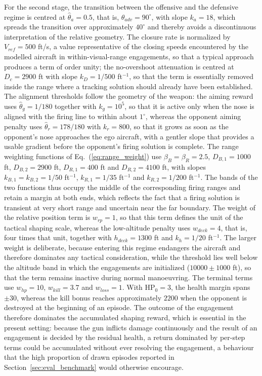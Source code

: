 \documentclass[pdflatex,sn-mathphys-num]{sn-jnl}%
\theoremstyle{thmstyleone}%
\theoremstyle{thmstyletwo}%
\theoremstyle{thmstylethree}%
\begin{document}
For the second stage, the transition between the offensive and the defensive regime is centred at $\hat{\theta}_{a}=0.5$, that is, $\theta_{adv}=90^\circ$, with slope $k_{a}=18$, which spreads the transition over approximately $40^\circ$ and thereby avoids a discontinuous interpretation of the relative geometry. The closure rate is normalized by $V_{ref}=500$ ft/s, a value representative of the closing speeds encountered by the modelled aircraft in within-visual-range engagements, so that a typical approach produces a term of order unity; the no-overshoot attenuation is centred at $D_{c}=2900$ ft with slope $k_{D}=1/500$ ft$^{-1}$, so that the term is essentially removed inside the range where a tracking solution should already have been established. The alignment thresholds follow the geometry of the weapon: the aiming reward uses $\hat{\theta}_{g}=1/180$ together with $k_{g}=10^{5}$, so that it is active only when the nose is aligned with the firing line to within about $1^\circ$, whereas the opponent aiming penalty uses $\hat{\theta}_{r}=178/180$ with $k_{r}=800$, so that it grows as soon as the opponent's nose approaches the ego aircraft, with a gentler slope that provides a usable gradient before the opponent's firing solution is complete. The range weighting functions of Eq.~(\ref{eq:range_weight}) use $\beta_{B}=\beta_{R}=2.5$, $D_{B,1}=1000$ ft, $D_{B,2}=2900$ ft, $D_{R,1}=400$ ft and $D_{R,2}=4100$ ft, with slopes $k_{B,1}=k_{B,2}=1/50$ ft$^{-1}$, $k_{R,1}=1/35$ ft$^{-1}$ and $k_{R,2}=1/200$ ft$^{-1}$. The bands of the two functions thus occupy the middle of the corresponding firing ranges and retain a margin at both ends, which reflects the fact that a firing solution is transient at very short range and uncertain near the far boundary. The weight of the relative position term is $w_{rp}=1$, so that this term defines the unit of the tactical shaping scale, whereas the low-altitude penalty uses $w_{deck}=4$, that is, four times that unit, together with $h_{deck}=1300$ ft and $k_{h}=1/20$ ft$^{-1}$. The larger weight is deliberate, because entering this regime endangers the aircraft and therefore dominates any tactical consideration, while the threshold lies well below the altitude band in which the engagements are initialized ($10000\pm1000$ ft), so that the term remains inactive during normal manoeuvring. The terminal terms use $w_{hp}=10$, $w_{kill}=3.7$ and $w_{loss}=1$. With $\mathrm{HP}_{0}=3$, the health margin spans $\pm30$, whereas the kill bonus reaches approximately $2200$ when the opponent is destroyed at the beginning of an episode. The outcome of the engagement therefore dominates the accumulated shaping reward, which is essential in the present setting: because the gun inflicts damage continuously and the result of an engagement is decided by the residual health, a return dominated by per-step terms could be accumulated without ever resolving the engagement, a behaviour that the high proportion of drawn episodes reported in Section~\ref{sec:eval_benchmark} would otherwise encourage.
\end{document}
